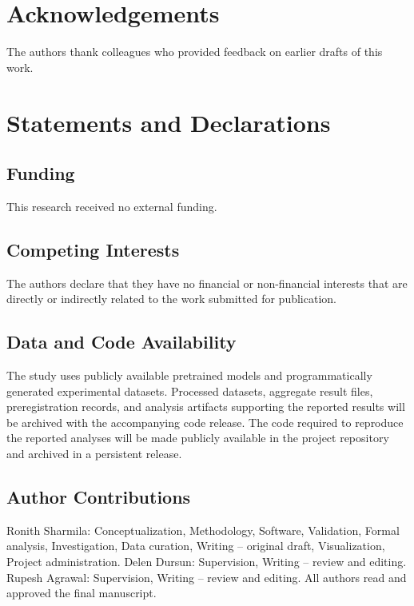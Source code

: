 \documentclass[pdflatex,sn-apa]{sn-jnl}
\begin{document}












\section*{Acknowledgements}
The authors thank colleagues who provided feedback on earlier drafts of this work.

\section*{Statements and Declarations}

\subsection*{Funding}
This research received no external funding.

\subsection*{Competing Interests}
The authors declare that they have no financial or non-financial interests that are directly or indirectly related to the work submitted for publication.

\subsection*{Data and Code Availability}
The study uses publicly available pretrained models and programmatically generated experimental datasets. Processed datasets, aggregate result files, preregistration records, and analysis artifacts supporting the reported results will be archived with the accompanying code release. The code required to reproduce the reported analyses will be made publicly available in the project repository and archived in a persistent release.

\subsection*{Author Contributions}
Ronith Sharmila: Conceptualization, Methodology, Software, Validation, Formal analysis, Investigation, Data curation, Writing -- original draft, Visualization, Project administration.
Delen Dursun: Supervision, Writing -- review and editing.
Rupesh Agrawal: Supervision, Writing -- review and editing.
All authors read and approved the final manuscript.


\end{document}
